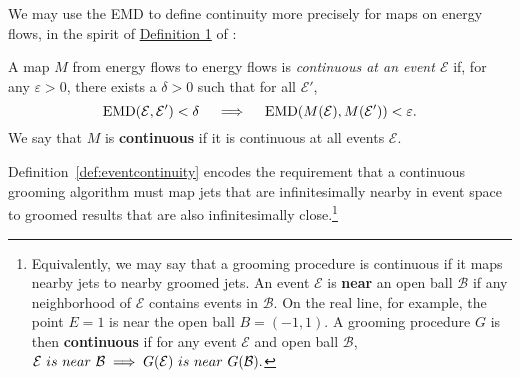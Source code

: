 \documentclass[letterpaper,11pt]{article}
\begin{document}
We may use the EMD to define continuity more precisely for maps on energy flows, in the spirit of \href{https://arxiv.org/pdf/2004.04159.pdf#page=5\&zoom=100,0,350}{Definition 1} of :
%
\begin{definition}\label{def:eventcontinuity}
A map \(M\) from energy flows to energy flows is \textit{continuous at an event \(\mathcal E\)} if, for any \(\varepsilon > 0\), there exists a \(\delta > 0\) such that for all \(\mathcal E'\),
%
\begin{equation*}\label{eqn:emdcontinuity}
    {\rm EMD}(\mathcal E,\mathcal E')<\delta
    \quad\implies\quad
    {\rm EMD}(M(\mathcal E), M(\mathcal E')) < \varepsilon.
\end{equation*}
%
We say that \(M\) is \textbf{continuous} if it is continuous at all events \(\mathcal{E}\).
\end{definition}
%
\noindent Definition~\ref{def:eventcontinuity} encodes the requirement that a continuous grooming algorithm must map jets that are infinitesimally nearby in event space to groomed results that are also infinitesimally close.\footnote{
Equivalently, we may say that a grooming procedure is continuous if it maps nearby jets to nearby groomed jets.
%
An event \(\mathcal{E}\) is \textbf{near} an open ball \(\mathcal{B}\) if any neighborhood of \(\mathcal{E}\) contains events in \(\mathcal{B}\).
%
On the real line, for example, the point \(E = 1\) is near the open ball \(B = (-1, 1)\).
%
A grooming procedure \(G\) is then \textbf{continuous} if for any event \(\mathcal{E}\) and open ball \(\mathcal{B}\),
    \(
    \mathcal{E} {\text ~is~ near~} \mathcal{B}
    \implies
    G(\mathcal{E}) {\text~ is~ near~} G(\mathcal{B}).
    \)
}
\end{document}
